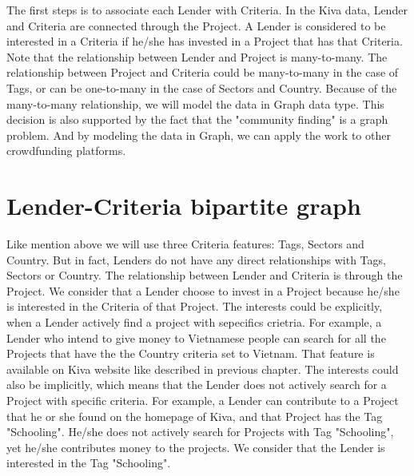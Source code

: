 The first steps is to associate each Lender with Criteria.
In the Kiva data, Lender and Criteria are connected through the Project.
A Lender is considered to be interested in a Criteria if he/she has invested in a Project that has that Criteria.
Note that the relationship between Lender and Project is many-to-many.
The relationship between Project and Criteria could be many-to-many in the case of Tags,
or can be one-to-many in the case of Sectors and Country.
Because of the many-to-many relationship, we will model the data in Graph data type.
This decision is also supported by the fact that the "community finding" is a graph problem.
And by modeling the data in Graph, we can apply the work to other crowdfunding platforms.

\section{Lender-Criteria bipartite graph}

Like mention above we will use three Criteria features: Tags, Sectors and Country.
But in fact, Lenders do not have any direct relationships with Tags, Sectors or Country.
The relationship between Lender and Criteria is through the Project.
We consider that a Lender choose to invest in a Project because he/she is interested in the Criteria of that Project.
The interests could be explicitly, when a Lender actively find a project with sepecifics crietria.
For example, a Lender who intend to give money to Vietnamese people can search for
all the Projects that have the the Country criteria set to Vietnam.
That feature is available on Kiva website like described in previous chapter.
The interests could also be implicitly, which means that the Lender does not actively search for a Project with specific criteria.
For example, a Lender can contribute to a Project that he or she found on the homepage of Kiva,
and that Project has the Tag "Schooling".
He/she does not actively search for Projects with Tag "Schooling",
yet he/she contributes money to the projects.
We consider that the Lender is interested in the Tag "Schooling".


